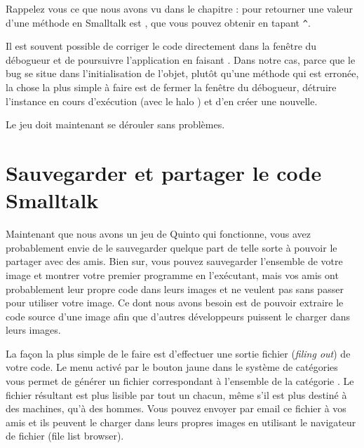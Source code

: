 \documentclass[a4paper,10pt,twoside]{book}
\begin{document}
\noindent
Rappelez vous ce que nous avons vu dans le chapitre  : pour retourner une valeur d'une méthode en Smalltalk est \ct{^}, que vous pouvez obtenir en tapant \verb|^|.

Il est souvent possible de corriger le code directement dans la fenêtre du débogueur et de poursuivre l'application en faisant .
Dans notre cas, parce que le bug se situe dans l'initialisation de l'objet, plutôt qu'une méthode qui est erronée, la chose la plus simple à faire est de fermer la fenêtre du débogueur, détruire l'instance en cours d'exécution (avec le halo ) et d'en créer une nouvelle.


Le jeu doit maintenant se dérouler sans problèmes.


\section{Sauvegarder et partager le code Smalltalk}
\label{sec:Monticello}

Maintenant que nous avons un jeu de Quinto qui fonctionne, vous avez probablement envie de le sauvegarder quelque part de telle sorte à pouvoir le partager avec des amis. Bien sur, vous pouvez sauvegarder l'ensemble de votre image \squeak et montrer votre premier programme en l'exécutant, mais vos amis ont probablement leur propre code dans leurs images et ne veulent pas sans passer pour utiliser votre image.
Ce dont nous avons besoin est de pouvoir extraire le code source d'une image \squeak afin que d'autres développeurs puissent le charger dans leurs images.

La façon la plus simple de le faire est d'effectuer une sortie fichier (\emph{filing out}) de votre code. Le menu activé par le bouton jaune dans le système de catégories vous permet de générer un fichier correspondant à l'ensemble de la catégorie .
Le fichier résultant est plus lisible par tout un chacun, même s'il est plus destiné à des machines, qu'à des hommes.
Vous pouvez envoyer par email ce fichier à vos amis et ils peuvent le charger dans leurs propres images \squeak en utilisant le navigateur de fichier (file list browser).
\end{document}
